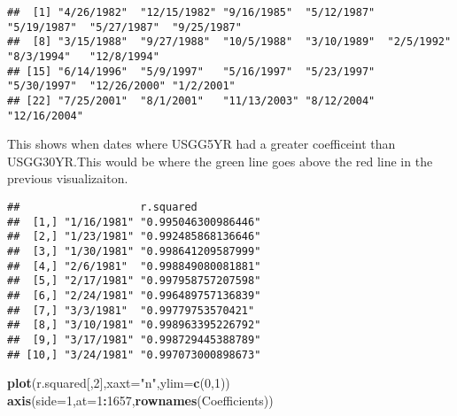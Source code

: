 \documentclass[]{article}
\newenvironment{Shaded}{\begin{snugshade}}{\end{snugshade}}
\newcommand{\KeywordTok}[1]{\textcolor[rgb]{0.13,0.29,0.53}{\textbf{#1}}}
\newcommand{\DataTypeTok}[1]{\textcolor[rgb]{0.13,0.29,0.53}{#1}}
\newcommand{\DecValTok}[1]{\textcolor[rgb]{0.00,0.00,0.81}{#1}}
\newcommand{\StringTok}[1]{\textcolor[rgb]{0.31,0.60,0.02}{#1}}
\newcommand{\OtherTok}[1]{\textcolor[rgb]{0.56,0.35,0.01}{#1}}
\newcommand{\ControlFlowTok}[1]{\textcolor[rgb]{0.13,0.29,0.53}{\textbf{#1}}}
\newcommand{\OperatorTok}[1]{\textcolor[rgb]{0.81,0.36,0.00}{\textbf{#1}}}
\newcommand{\NormalTok}[1]{#1}
\begin{document}
\begin{verbatim}
##  [1] "4/26/1982"  "12/15/1982" "9/16/1985"  "5/12/1987"  "5/19/1987"  "5/27/1987"  "9/25/1987" 
##  [8] "3/15/1988"  "9/27/1988"  "10/5/1988"  "3/10/1989"  "2/5/1992"   "8/3/1994"   "12/8/1994" 
## [15] "6/14/1996"  "5/9/1997"   "5/16/1997"  "5/23/1997"  "5/30/1997"  "12/26/2000" "1/2/2001"  
## [22] "7/25/2001"  "8/1/2001"   "11/13/2003" "8/12/2004"  "12/16/2004"
\end{verbatim}

This shows when dates where USGG5YR had a greater coefficeint than
USGG30YR.This would be where the green line goes above the red line in
the previous visualizaiton.

\begin{Shaded}
\end{Shaded}

\begin{verbatim}
##                   r.squared          
##  [1,] "1/16/1981" "0.995046300986446"
##  [2,] "1/23/1981" "0.992485868136646"
##  [3,] "1/30/1981" "0.998641209587999"
##  [4,] "2/6/1981"  "0.998849080081881"
##  [5,] "2/17/1981" "0.997958757207598"
##  [6,] "2/24/1981" "0.996489757136839"
##  [7,] "3/3/1981"  "0.99779753570421" 
##  [8,] "3/10/1981" "0.998963395226792"
##  [9,] "3/17/1981" "0.998729445388789"
## [10,] "3/24/1981" "0.997073000898673"
\end{verbatim}

\begin{Shaded}
\begin{Highlighting}[]
\KeywordTok{plot}\NormalTok{(r.squared[,}\DecValTok{2}\NormalTok{],}\DataTypeTok{xaxt=}\StringTok{"n"}\NormalTok{,}\DataTypeTok{ylim=}\KeywordTok{c}\NormalTok{(}\DecValTok{0}\NormalTok{,}\DecValTok{1}\NormalTok{))}
\KeywordTok{axis}\NormalTok{(}\DataTypeTok{side=}\DecValTok{1}\NormalTok{,}\DataTypeTok{at=}\DecValTok{1}\OperatorTok{:}\DecValTok{1657}\NormalTok{,}\KeywordTok{rownames}\NormalTok{(Coefficients))}
\end{Highlighting}
\end{Shaded}
\end{document}
